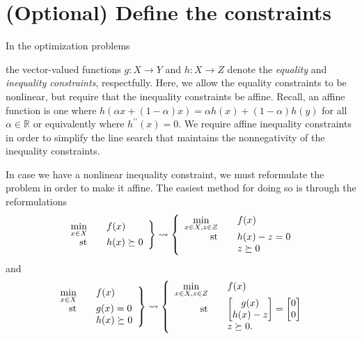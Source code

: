 \documentclass{report}
\newcommand{\re}{\mathbb{R}}
\newcommand{\st}{\textnormal{st}}
\newcommand{\secconstraints}{(Optional) Define the constraints}
\begin{document}
\section{\secconstraints}\label{sec:constraints}
        In the optimization problems
\begin{center}
    \usebox{\boxOptimizationTypes}
\end{center}
\noindent the vector-valued functions $g:X\rightarrow Y$ and $h:X\rightarrow Z$ denote the \textit{equality} and \textit{inequality constraints}, respectfully.  Here, we allow the equality constraints to be nonlinear, but require that the inequality constraints be affine.  Recall, an affine function is one where $h(\alpha x+(1-\alpha)x)=\alpha h(x)+(1-\alpha)h(y)$ for all $\alpha\in\re$ or equivalently where $h^{\prime\prime}(x)=0$.  We require affine inequality constraints in order to simplify the line search that maintains the nonnegativity of the inequality constraints.

        In case we have a nonlinear inequality constraint, we must reformulate the problem in order to make it affine.  The easiest method for doing so is through the reformulations
$$\left.\begin{array}{rcl}
        \min\limits_{x\in X} && f(x)\\
        \st && h(x)\succeq 0
\end{array}\right\}
\leadsto
\left\{\begin{array}{rcl}
        \min\limits_{x\in X,z\in Z} && f(x)\\
        \st && h(x)-z=0\\
            && z\succeq 0
\end{array}\right.$$
and
$$\left.\begin{array}{rcl}
        \min\limits_{x\in X} && f(x)\\
        \st && g(x)=0\\
            && h(x)\succeq 0
\end{array}\right\}
\leadsto
\left\{\begin{array}{rcl}
        \min\limits_{x\in X,z\in Z} && f(x)\\
        \st && \begin{bmatrix}g(x)\\h(x)-z\end{bmatrix}=\begin{bmatrix}0\\0\end{bmatrix}\\
            && z\succeq 0.
\end{array}\right.$$
\end{document}
